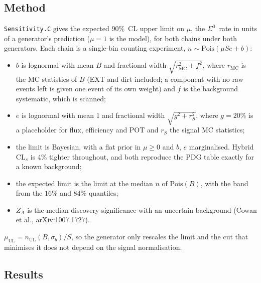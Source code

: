 \documentclass[11pt,a4paper]{article}
\newcommand{\Szero}{\ensuremath{\Sigma^{0}}}
\newcommand{\muUL}{\ensuremath{\mu_{\mathrm{UL}}}}
\begin{document}
\subsection{Method}
\texttt{Sensitivity.C} gives the expected 90\%~CL upper limit on $\mu$, the \Szero\ rate
in units of a generator's prediction ($\mu=1$ is the model), for both chains under
both generators. Each chain is a single-bin counting experiment,
$n\sim\mathrm{Pois}(\mu S e + b)$:
\begin{itemize}
  \item $b$ is lognormal with mean $B$ and fractional width
        $\sqrt{r_{\mathrm{MC}}^2+f^2}$, where $r_{\mathrm{MC}}$ is the MC statistics of
        $B$ (EXT and dirt included; a component with no raw events left is given one
        event of its own weight) and $f$ is the background systematic, which is scanned;
  \item $e$ is lognormal with mean 1 and fractional width $\sqrt{g^2+r_S^2}$, where
        $g=20\%$ is a placeholder for flux, efficiency and POT and $r_S$ the signal MC
        statistics;
  \item the limit is Bayesian, with a flat prior in $\mu\geq0$ and $b$, $e$
        marginalised. Hybrid CL$_s$ is $4\%$ tighter throughout, and both reproduce the
        PDG table exactly for a known background;
  \item the expected limit is the limit at the median $n$ of $\mathrm{Pois}(B)$, with
        the band from the $16\%$ and $84\%$ quantiles;
  \item $Z_A$ is the median discovery significance with an uncertain background
        (Cowan et al., arXiv:1007.1727).
\end{itemize}
$\muUL = n_{\mathrm{UL}}(B,\sigma_b)/S$, so the generator only rescales the limit and the
cut that minimises it does not depend on the signal normalisation.

\subsection{Results}
\end{document}
